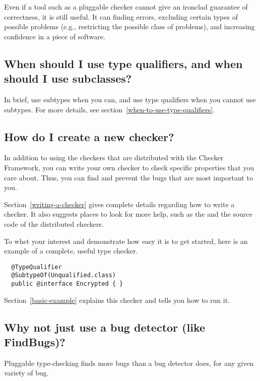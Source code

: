 
Even if a tool such as a pluggable checker cannot give an ironclad
guarantee of correctness, it is still useful.  It can finding errors, 
excluding certain types of possible problems (e.g., restricting the
possible class of problems), and increasing confidence in a piece of
software.


\subsection{When should I use type qualifiers, and when should I use subclasses?}

In brief, use subtypes when you can, and use type qualifiers when you cannot
use subtypes.
For more details, see section~\ref{when-to-use-type-qualifiers}.


\subsection{How do I create a new checker?}

In addition to using the checkers that are distributed with the Checker
Framework, you can write your own checker to check specific properties that
you care about.  Thus, you can find and prevent the bugs that are most
important to you.

Section~\ref{writing-a-checker} gives
complete details regarding how to write a checker.  It also suggests places
to look for more help, such as the  and the source code of the distributed
checkers.

To whet your interest and demonstrate how easy it is to get started, here
is an example of a complete, useful type checker.

\begin{Verbatim}
  @TypeQualifier
  @SubtypeOf(Unqualified.class)
  public @interface Encrypted { }
\end{Verbatim}

Section~\ref{basic-example} explains this checker and tells
you how to run it.



\subsection{Why not just use a bug detector (like FindBugs)?}

Pluggable type-checking finds more bugs than a bug detector does, for any
given variety of bug.


